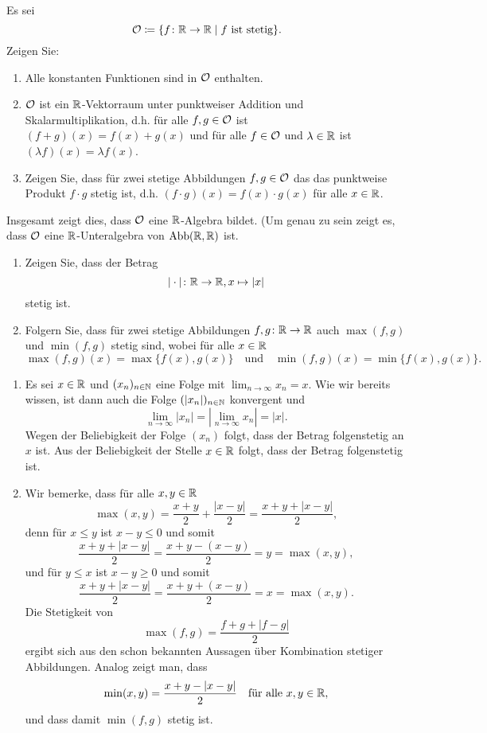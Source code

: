 \documentclass[a4paper,10pt]{article}
\begin{document}
\begin{question}
 Es sei
 \[
  \mathcal{O} \coloneqq \{f \colon \mathbb{R} \to \mathbb{R} \mid \text{$f$ ist stetig}\}.
 \]
 Zeigen Sie:
 \begin{enumerate}
  \item
   Alle konstanten Funktionen sind in $\mathcal{O}$ enthalten.
  \item
   $\mathcal{O}$ ist ein $\mathbb{R}$-Vektorraum unter punktweiser Addition und Skalarmultiplikation, d.h. für alle $f, g \in \mathcal{O}$ ist $(f+g)(x) = f(x)+g(x)$ und für alle $f \in \mathcal{O}$ und $\lambda \in \mathbb{R}$ ist $(\lambda f)(x) = \lambda f(x)$.
  \item
   Zeigen Sie, dass für zwei stetige Abbildungen $f, g \in \mathcal{O}$ das das punktweise Produkt $f \cdot g$ stetig ist, d.h. $(f \cdot g)(x) = f(x) \cdot g(x)$ für alle $x \in \mathbb{R}$.
 \end{enumerate}
 Insgesamt zeigt dies, dass $\mathcal{O}$ eine $\mathbb{R}$-Algebra bildet. (Um genau zu sein zeigt es, dass $\mathcal{O}$ eine $\mathbb{R}$-Unteralgebra von $\operatorname{Abb}(\mathbb{R}, \mathbb{R})$ ist.
\end{question}


\begin{question}
 \begin{enumerate}
  \item
   Zeigen Sie, dass der Betrag
   \[
    |\cdot| \colon \mathbb{R} \to \mathbb{R}, x \mapsto |x|
   \]
   stetig ist.
  \item
   Folgern Sie, dass für zwei stetige Abbildungen $f, g \colon \mathbb{R} \to \mathbb{R}$ auch $\max(f,g)$ und $\min(f,g)$ stetig sind, wobei für alle $x \in \mathbb{R}$
   \[
    \max(f,g)(x) = \max\{f(x),g(x)\}
    \quad
    \text{und}
    \quad
    \min(f,g)(x) = \min\{f(x),g(x)\}.
   \]
 \end{enumerate}
\end{question}
\begin{solution}
 \begin{enumerate}
  \item
   Es sei $x \in \mathbb{R}$ und $(x_n)_{n \in \mathbb{N}}$ eine Folge mit $\lim_{n \to \infty} x_n = x$. Wie wir bereits wissen, ist dann auch die Folge $(|x_n|)_{n \in \mathbb{N}}$ konvergent und
   \[
    \lim_{n \to \infty} |x_n|
    = \left| \lim_{n \to \infty} x_n \right|
    = |x|.
   \]
   Wegen der Beliebigkeit der Folge $(x_n)$ folgt, dass der Betrag folgenstetig an $x$ ist. Aus der Beliebigkeit der Stelle $x \in \mathbb{R}$ folgt, dass der Betrag folgenstetig ist.
  \item
   Wir bemerke, dass für alle $x,y \in \mathbb{R}$
   \[
    \max(x,y) = \frac{x+y}{2} + \frac{|x-y|}{2} = \frac{x+y+|x-y|}{2},
   \]
   denn für $x \leq y$ ist $x-y \leq 0$ und somit
   \[
    \frac{x+y+|x-y|}{2}
    = \frac{x+y-(x-y)}{2}
    = y
    = \max(x,y),
   \]
   und für $y \leq x$ ist $x-y \geq 0$ und somit
   \[
    \frac{x+y+|x-y|}{2}
    = \frac{x+y+(x-y)}{2}
    = x
    = \max(x,y).
   \]
   Die Stetigkeit von
   \[
    \max(f,g) = \frac{f+g+|f-g|}{2}
   \]
   ergibt sich aus den schon bekannten Aussagen über Kombination stetiger Abbildungen. Analog zeigt man, dass
   \[
    \min(x,y) = \frac{x+y-|x-y|}{2} \quad \text{für alle $x,y \in \mathbb{R}$},
   \]
   und dass damit $\min(f,g)$ stetig ist.
 \end{enumerate}
\end{solution}
\end{document}
